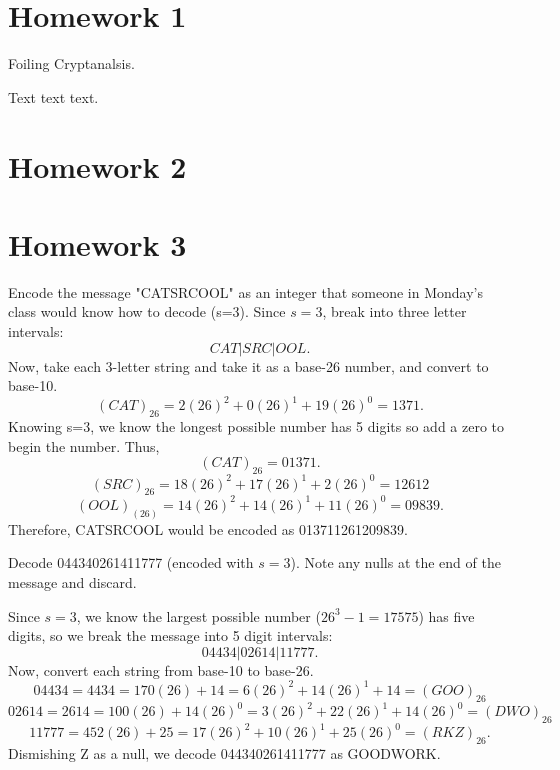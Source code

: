 \section{Homework 1}
\begin{problem} Foiling Cryptanalsis. \end{problem}
\solution Text text text.

\section{Homework 2}

\section{Homework 3}
\begin{problem} Encode the message "CATSRCOOL" as an integer that someone in Monday's class would know how to decode (s=3).
\solution Since $s=3$, break into three letter intervals: $$CAT|SRC|OOL.$$ Now, take each 3-letter string and take it as a base-26 number, and convert to base-10. $$(CAT)_
{26} = 2(26)^2 + 0(26)^1 + 19 (26)^0 = 1371.$$
Knowing s=3, we know the longest possible number has 5 digits so add a zero to begin the number. Thus, $$(CAT)_{26}=01371.$$
$$(SRC)_{26} = 18(26)^2 + 17(26)^1 + 2(26)^0=12612$$ $$(OOL)_(26) = 14(26)^2 + 14(26)^1 + 11(26)^0 = 09839.$$ Therefore, CATSRCOOL would be encoded as 013711261209839.

\begin{problem} Decode 044340261411777 (encoded with $s=3$). Note any nulls at the end of the message and discard.
\end{problem}
\solution Since $s=3$, we know the largest possible number ($26^3-1=17575$) has five digits, so we break the message into 5 digit intervals: $$04434|02614|11777.$$ Now, convert each string from base-10 to base-26. $$04434=4434=170(26)+14=6(26)^2 +14(26)^1 + 14 = (GOO)_{26}$$ $$02614=2614=100(26)+14(26)^0 = 3(26)^2 + 22(26)^1 + 14(26)^0 = (DWO)_{26}$$ $$11777=452(26) + 25 = 17(26)^2 + 10(26)^1 + 25 (26)^0 = (RKZ)_{26}.$$ Dismishing Z as a null, we decode 044340261411777 as GOODWORK.

\end{problem}
